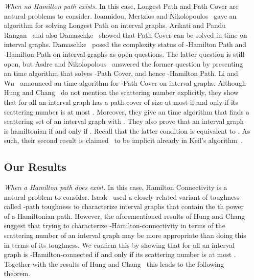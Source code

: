 \documentclass{llncs}
\begin{document}
\medskip
\noindent
{\it When no Hamilton path exists.}
In this case, {\sc Longest Path} and {\sc Path Cover} are natural problems to consider.
Ioannidou, Mertzios and Nikolopoulos~\cite{IMN11} gave an  algorithm for solving {\sc Longest Path} on interval graphs.
Arikati and Pandu Rangan~\cite{AP90} and also Damaschke~\cite{Da93}
showed that {\sc Path Cover} can be solved in  time on interval graphs. 
Damaschke~\cite{Da93}  
posed the complexity status of {-Hamilton Path} and {-Hamilton Path} on interval graphs as open questions. 
The latter question is still open, but Asdre and Nikolopolous~\cite{AN10} answered the former 
question  by presenting an  time algorithm that solves {-Path Cover}, and hence {-Hamilton Path}.
Li and Wu~\cite{LW} announced an  time algorithm for {-Path Cover} on interval graphs.
Although Hung and Chang~\cite{HC11} do not mention the scattering number explicitly, they show that for all 
an interval graph has a path cover of size at most  if and only if its scattering number is at 
most . Moreover, they give an  time algorithm that finds a scattering set of an interval graph  with .
They also prove that an interval graph  is hamiltonian if and only if . Recall that the latter condition is equivalent to . 
As such, their second result is claimed~\cite{CJKL98,KKS07} to be implicit already in Keil's algorithm~\cite{Ke85}.


  \subsection{Our Results}\label{s-ours}
 
 {\it When a Hamilton path does exist.} 
 In this case, {\sc Hamilton Connectivity} is a natural problem to consider.
 Isaak~\cite{Is98} used a closely related variant of toughness called -path toughness to characterize interval graphs that contain the th power of a Hamiltonian path. However, the aforementioned results of Hung and Chang~\cite{HC11} suggest that trying to characterize -Hamilton-connectivity in terms
 of the scattering number of an interval graph may be more appropriate than doing this in terms of its toughness. We confirm this by showing that for all  an interval graph is -Hamilton-connected if and only if its scattering number is at most . Together with the results of Hung and Chang~\cite{HC11} this leads to the following theorem.
  
\end{document}
